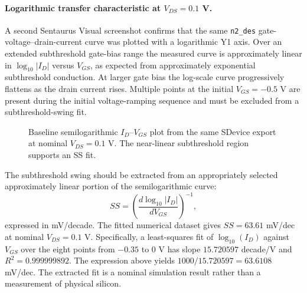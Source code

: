 \documentclass[11pt,a4paper]{article}
\begin{document}
\paragraph{Logarithmic transfer characteristic at $V_{DS}=0.1$ V.}
A second Sentaurus Visual screenshot confirms that the same \texttt{n2\_des} gate-voltage--drain-current curve was plotted with a logarithmic Y1 axis. Over an extended subthreshold gate-bias range the measured curve is approximately linear in $\log_{10}|I_D|$ versus $V_{GS}$, as expected from approximately exponential subthreshold conduction. At larger gate bias the log-scale curve progressively flattens as the drain current rises. Multiple points at the initial $V_{GS}=-0.5$ V are present during the initial voltage-ramping sequence and must be excluded from a subthreshold-swing fit.
\begin{figure}[H]
\centering
{}
\caption{Baseline semilogarithmic $I_D$--$V_{GS}$ plot from the same SDevice export at nominal $V_{DS}=0.1$ V. The near-linear subthreshold region supports an SS fit.}
\label{fig:idvg_vd01_log}
\end{figure}
The subthreshold swing should be extracted from an appropriately selected approximately linear portion of the semilogarithmic curve:
\[
SS=\left(\frac{d\log_{10}|I_D|}{d V_{GS}}\right)^{-1},
\]
expressed in mV/decade. The fitted numerical dataset gives $SS=63.61$ mV/dec at nominal $V_{DS}=0.1$ V. Specifically, a least-squares fit of $\log_{10}(I_D)$ against $V_{GS}$ over the eight points from $-0.35$ to $0$ V has slope $15.720597$ decade/V and $R^2=0.999999892$. The expression above yields $1000/15.720597=63.6108$ mV/dec. The extracted fit is a nominal simulation result rather than a measurement of physical silicon.
\end{document}
